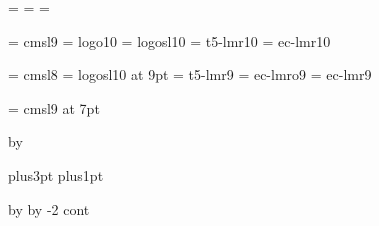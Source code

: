 % 






\TUBfinal

\headmargin=\normalheadmargin
\rheadlgt=\normalrheadlgt
\collgt=\normalcollgt
\resetpagelgt

\let\runhead=\normalrunhead
\let\runfoot=\normalrunfoot

\tenpoint\baselineskip=12.5pt       %
  \font\slnine = cmsl9
  \font\manual = logo10
  \font\manualsl = logosl10
  \font\thanhfont = t5-lmr10
  \font\lslashfont = ec-lmr10

\iftrue
\ninepoint\baselineskip=11.1pt     %
  \font\slnine = cmsl8
  \font\manual = logosl10 at 9pt
  \font\thanhfont = t5-lmr9
  \font\lslashfont = ec-lmro9
  \font\lslashrmfont = ec-lmr9
  \AdjustNormalSpacing{}
\fi

\font\slc = cmsl9 at 7pt  %

\LoadSansFonts
\Trimmarkstrue
\NoBlackBoxes
\def\rtitle{}

\vfuzz=0pc 			%
  \advance\vsize by \vfuzz

\secskipa=0pt plus3pt       %
\secskipb=0pt plus1pt       %

% 
{
 \hfuzz=2pc                     %
 \advance\hsize by \hfuzz
 \advance\voffset by -2\baselineskip %
 \Input cont
}
\bye %
